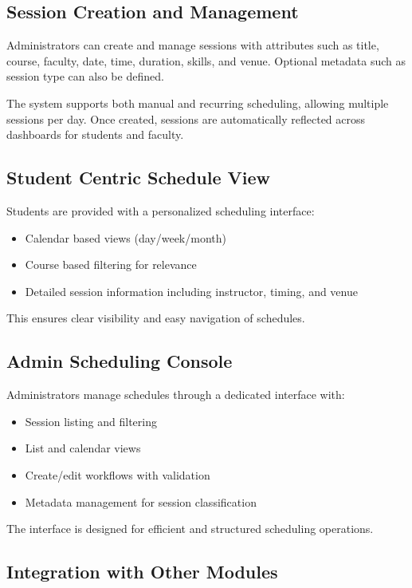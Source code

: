 \subsection{Session Creation and Management}

Administrators can create and manage sessions with attributes such as title, course, faculty, date,
time, duration, skills, and venue. Optional metadata such as session type can also be defined.

The system supports both manual and recurring scheduling, allowing multiple sessions per day. Once
created, sessions are automatically reflected across dashboards for students and faculty.

\subsection{Student Centric Schedule View}

Students are provided with a personalized scheduling interface:

\begin{itemize}
    \item Calendar based views (day/week/month)
    \item Course based filtering for relevance
    \item Detailed session information including instructor, timing, and venue
\end{itemize}

This ensures clear visibility and easy navigation of schedules.

\subsection{Admin Scheduling Console}

Administrators manage schedules through a dedicated interface with:

\begin{itemize}
    \item Session listing and filtering
    \item List and calendar views
    \item Create/edit workflows with validation
    \item Metadata management for session classification
\end{itemize}

The interface is designed for efficient and structured scheduling operations.

\subsection{Integration with Other Modules}

